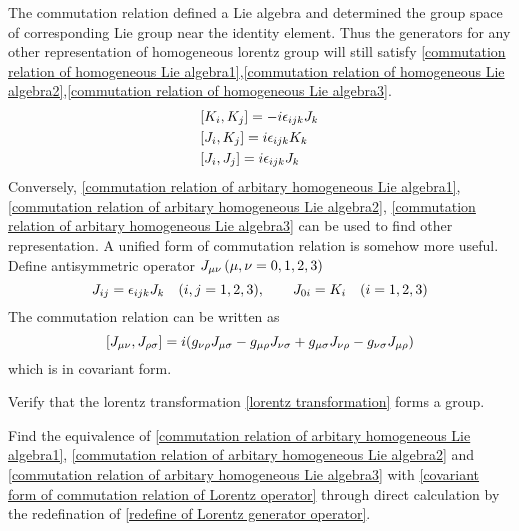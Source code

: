    The commutation relation defined a Lie algebra and determined the group space of corresponding Lie group near the identity element. Thus the generators for any other representation of homogeneous lorentz group will still satisfy \eqref{commutation relation of homogeneous Lie algebra1},\eqref{commutation relation of homogeneous Lie algebra2},\eqref{commutation relation of homogeneous Lie algebra3}. 
   \begin{align}
   &[K_i,K_j] = -i \epsilon_{ijk} J_k
   \label{commutation relation of arbitary homogeneous Lie algebra1}\\
   &[J_i,K_j] = i \epsilon_{ijk} K_k
   \label{commutation relation of arbitary homogeneous Lie algebra2}\\
   &[J_i,J_j] = i \epsilon_{ijk} J_k
   \label{commutation relation of arbitary homogeneous Lie algebra3}
   \end{align}
   Conversely, \eqref{commutation relation of arbitary homogeneous Lie algebra1}, \eqref{commutation relation of arbitary homogeneous Lie algebra2}, \eqref{commutation relation of arbitary homogeneous Lie algebra3} can be used to find other representation. A unified form of commutation relation is somehow more useful. Define antisymmetric operator $J_{\mu\nu}\,(\mu,\nu = 0,1,2,3)$
   \begin{equation}\label{redefine of Lorentz generator operator}
   J_{ij} = \epsilon_{ijk}J_k \quad (i,j = 1,2,3),\qquad
   J_{0i} = K_i \quad (i = 1,2,3)
   \end{equation}
   The commutation relation can be written as
   \begin{equation}\label{covariant form of commutation relation of Lorentz operator}
   \comm{J_{\mu\nu}}{J_{\rh\s}} = 
   i
   (g_{\n\rh}J_{\m\s}
   -g_{\m\rh}J_{\n\s}
   +g_{\m\s}J_{\n\rh}
   -g_{\n\s}J_{\m\rh}
   )
   \end{equation}
   which is in covariant form.
   \begin{Exe}\qquad
   	
   	Verify that the lorentz transformation \eqref{lorentz transformation} forms a group.
   \end{Exe}
   
   \begin{Exe}\qquad
   	
   	Find the equivalence of \eqref{commutation relation of arbitary homogeneous Lie algebra1}, \eqref{commutation relation of arbitary homogeneous Lie algebra2} and \eqref{commutation relation of arbitary homogeneous Lie algebra3} with \eqref{covariant form of commutation relation of Lorentz operator} through direct calculation by the redefination of \eqref{redefine of Lorentz generator operator}.  
   \end{Exe}

